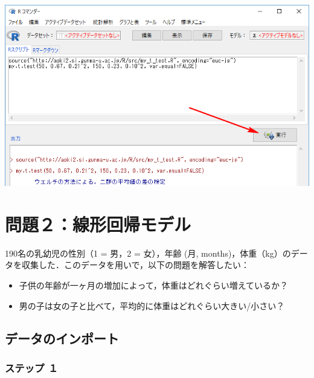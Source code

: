 \documentclass[11pt,]{problemset}
\begin{document}
\begin{center}\includegraphics[width=0.9\linewidth]{pic/myttest02cut} \end{center}

\bigskip

\newpage

\vfill

\section{問題２：線形回帰モデル}

190名の乳幼児の性別（1 = 男，2 = 女），年齢 (月,
months)，体重（kg）のデータを収集した．このデータを用いで，以下の問題を解答したい：

\begin{itemize}
\item
  子供の年齢が一ヶ月の増加によって，体重はどれぐらい増えているか？
\item
  男の子は女の子と比べて，平均的に体重はどれぐらい大きい/小さい？
\end{itemize}

\subsection{データのインポート}

\subsubsection{ステップ １}
\end{document}

